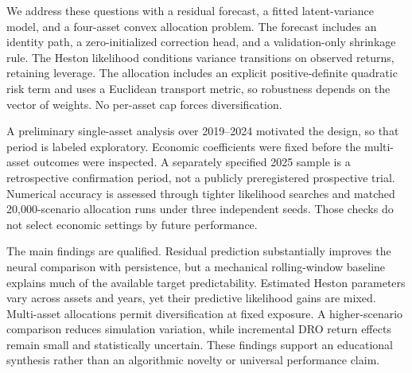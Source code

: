 We address these questions with a residual forecast, a fitted latent-variance model, and a four-asset convex allocation problem. The forecast includes an identity path, a zero-initialized correction head, and a validation-only shrinkage rule. The Heston likelihood conditions variance transitions on observed returns, retaining leverage. The allocation includes an explicit positive-definite quadratic risk term and uses a Euclidean transport metric, so robustness depends on the vector of weights. No per-asset cap forces diversification.

A preliminary single-asset analysis over 2019--2024 motivated the design, so that period is labeled exploratory. Economic coefficients were fixed before the multi-asset outcomes were inspected. A separately specified 2025 sample is a retrospective confirmation period, not a publicly preregistered prospective trial. Numerical accuracy is assessed through tighter likelihood searches and matched 20,000-scenario allocation runs under three independent seeds. Those checks do not select economic settings by future performance.

The main findings are qualified. Residual prediction substantially improves the neural comparison with persistence, but a mechanical rolling-window baseline explains much of the available target predictability. Estimated Heston parameters vary across assets and years, yet their predictive likelihood gains are mixed. Multi-asset allocations permit diversification at fixed exposure. A higher-scenario comparison reduces simulation variation, while incremental DRO return effects remain small and statistically uncertain. These findings support an educational synthesis rather than an algorithmic novelty or universal performance claim.
